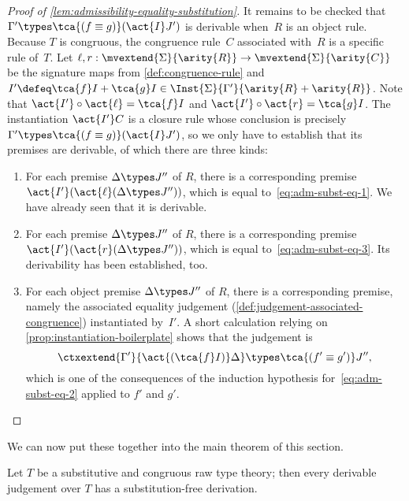 \begin{proof}[Proof of \cref{lem:admissibility-equality-substitution}]
  It remains to be checked that $\Gamma' \types \tca{(f \equiv g)} (\act{I} J')$ is derivable when~$R$ is an object rule. Because $T$ is congruous, the congruence rule~$C$ associated with~$R$ is a specific rule of~$T$. Let $\ell, r : \mvextend{\Sigma}{\arity{R}} \to \mvextend{\Sigma}{\arity{C}}$ be the signature maps from \cref{def:congruence-rule}
  and $I' \defeq \tca{f} I + \tca{g} I \in \Inst{\Sigma}{\Gamma'}{\arity{R} + \arity{R}}$. Note that $\act{I'} \circ \act{\ell} = \tca{f} I$ and $\act{I'} \circ \act{r} = \tca{g} I$.
  The instantiation $\act{I'} C$ is a closure rule whose conclusion is precisely $\Gamma' \types \tca{(f \equiv g)} (\act{I} J')$, so we only have to establish that its premises are derivable, of which there are three kinds:
  \begin{enumerate}
  \item For each premise $\Delta \types J''$ of $R$, there is a corresponding premise $\act{I'}(\act{\ell}(\Delta \types J''))$, which is equal to~\eqref{eq:adm-subst-eq-1}.
    We have already seen that it is derivable.
  \item For each premise $\Delta \types J''$ of $R$, there is a corresponding premise $\act{I'}(\act{r}(\Delta \types J''))$, which is equal to~\eqref{eq:adm-subst-eq-3}.
    Its derivability has been established, too.
  \item For each object premise $\Delta \types J''$ of $R$, there is a corresponding premise, namely the associated equality judgement (\cref{def:judgement-associated-congruence}) instantiated by~$I'$. A short calculation relying on \cref{prop:instantiation-boilerplate} shows that the judgement is
    \begin{equation*}
      \ctxextend {\Gamma'}{\act{(\tca{f} I)} \Delta} \types \tca{(f' \equiv g')} J'',
    \end{equation*}
    which is one of the consequences of the induction hypothesis for~\eqref{eq:adm-subst-eq-2} applied to $f'$ and $g'$. \qedhere
  \end{enumerate}
\end{proof}

We can now put these together into the main theorem of this section.

\begin{theorem}
  \label{thm:elimination-substitution}%
  Let $T$ be a substitutive and congruous raw type theory; then every derivable judgement over $T$ has a substitution-free derivation.
\end{theorem}


